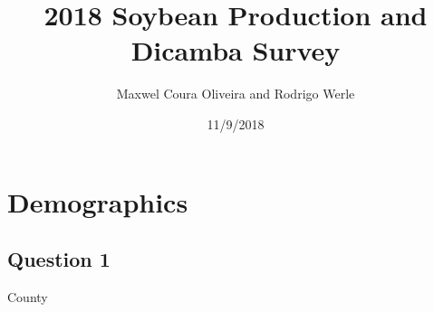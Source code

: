 \documentclass[]{article}
\title{2018 Soybean Production and Dicamba Survey}
\author{Maxwel Coura Oliveira and Rodrigo Werle}
\date{11/9/2018}
\begin{document}
\maketitle

\section{Demographics}\label{demographics}

\subsection{Question 1}\label{question-1}

County

\begin{table}[H]
\centering{}


\end{table}
\end{document}
